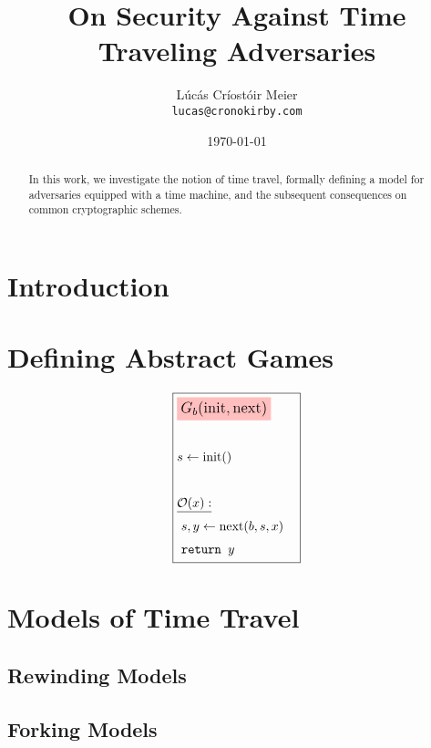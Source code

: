 

\date{\today}
\title{On Security Against Time Traveling Adversaries}
\author{Lúcás Críostóir Meier\\\texttt{lucas@cronokirby.com}}



\maketitle

\begin{abstract}
    \noindent In this work, we investigate the notion of
    time travel, formally defining a model for adversaries
    equipped with a time machine, and the subsequent consequences
    on common cryptographic schemes.
\end{abstract}

\section{Introduction}

\cite{maurer_unifying_2009}

\section{Defining Abstract Games}

\begin{game}
\captionsetup{justification=centering}
$$
\boxed{
\begin{aligned}
&\colorbox{pink}{\large $G_b(\text{init}, \text{next})$}\cr
\cr
&s \gets \text{init}()\cr
&\cr
&\underline{\mathcal{O}(x):}\cr
&\ s, y \gets \text{next}(b, s, x)\cr
&\ \texttt{return } y
\end{aligned}
}
$$
\caption{$G_b(\text{init}, \text{next})$}
\end{game}

\section{Models of Time Travel}

\subsection{Rewinding Models}

\subsection{Forking Models}

